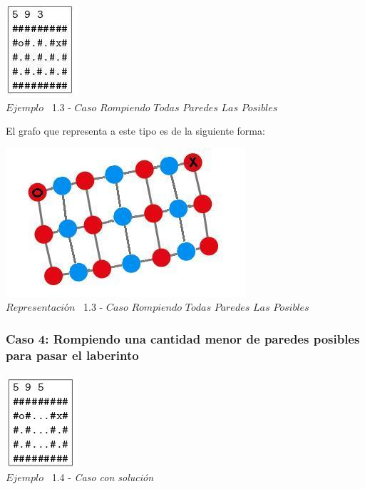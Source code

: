 \vspace*{0.3cm} \vspace*{0.3cm}
  \begin{center}
 \includegraphics[scale=1.6]{./EJ1/ej1rompertodasparedes.jpeg}
\\ {$Ejemplo$ \ 1.3 - $Caso$ $Rompiendo$ $Todas$ $Paredes$ $Las$ $Posibles$}
  \end{center}
  \vspace*{0.3cm}

El grafo que representa a este tipo es de la siguiente forma:\\

\vspace*{0.3cm} \vspace*{0.3cm}
  \begin{center}
 \includegraphics[scale=0.5]{./EJ1/ej1grafosolucionconpared.jpeg}
 \\{$Representación$ \ 1.3 - $Caso$ $Rompiendo$ $Todas$ $Paredes$ $Las$ $Posibles$}
  \end{center}
  \vspace*{0.3cm}


\begin{center}
  \subsubsection*{Caso 4: Rompiendo una cantidad menor de paredes posibles para pasar el laberinto}
\end{center}


\vspace*{0.3cm} \vspace*{0.3cm}
  \begin{center}
 \includegraphics[scale=1.6]{./EJ1/ej1random.jpeg}
\\ {$Ejemplo$ \ 1.4 - \textit{Caso con solución}}
  \end{center}
  \vspace*{0.3cm}

